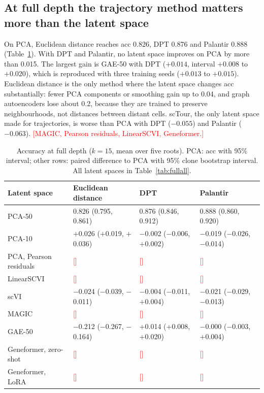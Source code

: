 \documentclass[10pt,a4paper,twocolumn]{article}
\newcommand{\todo}[1]{\textcolor{red}{[#1]}}
\begin{document}
\subsection{At full depth the trajectory method matters more than the latent space}
On PCA, Euclidean distance reaches acc 0.826, DPT 0.876 and Palantir 0.888
(Table~\ref{tab:full}). With DPT and Palantir, no latent space improves on PCA by more than
0.015. The largest gain is GAE-50 with DPT ($+0.014$, interval $+0.008$ to $+0.020$), which is
reproduced with three training seeds ($+0.013$ to $+0.015$). Euclidean distance is the only method
where the latent space changes acc substantially: fewer PCA components or smoothing gain up to
0.04, and graph autoencoders lose about 0.2, because they
are trained to preserve neighbourhoods, not distances between distant cells. scTour, the only
latent space made for trajectories, is worse than PCA with DPT ($-0.055$) and Palantir ($-0.063$).
\todo{MAGIC, Pearson residuals, LinearSCVI, Geneformer.}

\begin{table}[t]
\centering\small
\caption{Accuracy at full depth ($k=15$, mean over five roots). PCA: acc with 95\% interval;
other rows: paired difference to PCA with 95\% clone bootstrap interval. All latent spaces in
Table~\ref{tab:fullall}.}
\label{tab:full}
\scriptsize
\setlength{\tabcolsep}{3pt}
\begin{tabular}{llll}
\toprule
Latent space & Euclidean distance & DPT & Palantir \\
\midrule
PCA-50 & 0.826 (0.795, 0.861) & 0.876 (0.846, 0.912) & 0.888 (0.860, 0.920) \\
\midrule
PCA-10 & $+$0.026 ($+$0.019, $+$0.036) & $-$0.002 ($-$0.006, $+$0.002) & $-$0.019 ($-$0.026, $-$0.014) \\
PCA, Pearson residuals & \todo{} & \todo{} & \todo{} \\
LinearSCVI & \todo{} & \todo{} & \todo{} \\
scVI & $-$0.024 ($-$0.039, $-$0.011) & $-$0.004 ($-$0.011, $+$0.004) & $-$0.021 ($-$0.029, $-$0.013) \\
MAGIC & \todo{} & \todo{} & \todo{} \\
GAE-50 & $-$0.212 ($-$0.267, $-$0.164) & $+$0.014 ($+$0.008, $+$0.020) & $-$0.000 ($-$0.003, $+$0.004) \\
Geneformer, zero-shot & \todo{} & \todo{} & \todo{} \\
Geneformer, LoRA & \todo{} & \todo{} & \todo{} \\
\bottomrule
\end{tabular}
\end{table}
\end{document}
